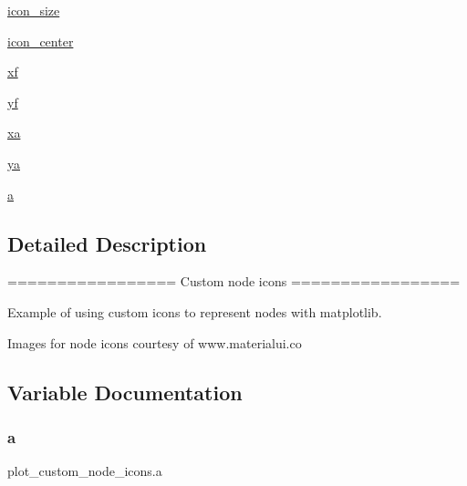 \begin{DoxyCompactItemize}
\item 
\hyperlink{namespaceplot__custom__node__icons_a60740d57e46191af2f22d802828318bd}{icon\+\_\+size}
\item 
\hyperlink{namespaceplot__custom__node__icons_abbbec57351f2d20a0558b00515d1138f}{icon\+\_\+center}
\item 
\hyperlink{namespaceplot__custom__node__icons_aef99d3c588ab23582e101d021b464a40}{xf}
\item 
\hyperlink{namespaceplot__custom__node__icons_a798be74417e21641678a40b4abdd1390}{yf}
\item 
\hyperlink{namespaceplot__custom__node__icons_ab99646d27d66aa868a94fff1be03695c}{xa}
\item 
\hyperlink{namespaceplot__custom__node__icons_a13f2dc93046f16c9c251a1584e8828e1}{ya}
\item 
\hyperlink{namespaceplot__custom__node__icons_ac42203cd5170ad6b88b0f91bef763875}{a}
\end{DoxyCompactItemize}


\subsection{Detailed Description}
\begin{DoxyVerb}=================
Custom node icons
=================

Example of using custom icons to represent nodes with matplotlib.

Images for node icons courtesy of www.materialui.co
\end{DoxyVerb}
 

\subsection{Variable Documentation}
\mbox{\label{namespaceplot__custom__node__icons_ac42203cd5170ad6b88b0f91bef763875}} 
\subsubsection{\texorpdfstring{a}{a}}
{\footnotesize\ttfamily plot\+\_\+custom\+\_\+node\+\_\+icons.\+a}

\mbox{\label{namespaceplot__custom__node__icons_a5170af57723c73a5fa90a7a8f3e66cd7}} 
